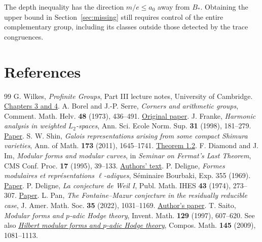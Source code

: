 \documentclass[a4paper,11pt]{article}
\theoremstyle{definition}
\theoremstyle{remark}
\numberwithin{equation}{section}
\begin{document}
The depth inequality has the direction \(m/e\le a_0\) away from
\(B_*\). Obtaining the upper bound in Section~\ref{sec:missing}
still requires control of the entire complementary group, including
its classes outside those detected by the trace congruences.

\clearpage
\section{References}\label{nav:bibliography-VI}
\begingroup{}\begin{thebibliography}{99}\small
{} G. Wilkes, \emph{Profinite Groups}, Part III lecture notes, University of Cambridge. \href{https://www.dpmms.cam.ac.uk/~grw46/LectureNotes.pdf}{Chapters 3 and 4}.
 A. Borel and J.-P. Serre, \emph{Corners and arithmetic groups}, Comment. Math. Helv. \textbf{48} (1973), 436--491. \href{https://www.e-periodica.ch/cntmng?pid=com-001:1973:48::32}{Original paper}.
 J. Franke, \emph{Harmonic analysis in weighted \(L_2\)-spaces}, Ann. Sci. Ecole Norm. Sup. \textbf{31} (1998), 181--279. \href{https://www.numdam.org/articles/10.1016/s0012-9593(98)80015-3/}{Paper}.
 S. W. Shin, \emph{Galois representations arising from some compact Shimura varieties}, Ann. of Math. \textbf{173} (2011), 1645--1741. \href{https://annals.math.princeton.edu/2011/173-3/p09}{Theorem 1.2}.
 F. Diamond and J. Im, \emph{Modular forms and modular curves}, in \emph{Seminar on Fermat's Last Theorem}, CMS Conf. Proc. \textbf{17} (1995), 39--133. \href{https://wstein.org/edu/Fall2003/252/references/diamond-im/Diamond-Im-Modular_forms_and_modular_curves.pdf}{Authors' text}.
 P. Deligne, \emph{Formes modulaires et repr\'esentations \(\ell\)-adiques}, S\'eminaire Bourbaki, Exp. 355 (1969). \href{https://www.numdam.org/item/SB_1968-1969__11__139_0.pdf}{Paper}.
 P. Deligne, \emph{La conjecture de Weil I}, Publ. Math. IHES \textbf{43} (1974), 273--307. \href{https://numdam.org/articles/10.1007/BF02684373/}{Paper}.
 L. Pan, \emph{The Fontaine--Mazur conjecture in the residually reducible case}, J. Amer. Math. Soc. \textbf{35} (2022), 1031--1169. \href{https://arxiv.org/abs/1901.07166}{Author's paper}.
 T. Saito, \emph{Modular forms and \(p\)-adic Hodge theory}, Invent. Math. \textbf{129} (1997), 607--620. See also \href{https://www.ms.u-tokyo.ac.jp/~t-saito/pp/h.pdf}{\emph{Hilbert modular forms and \(p\)-adic Hodge theory}}, Compos. Math. \textbf{145} (2009), 1081--1113.

\end{thebibliography}
\end{document}
